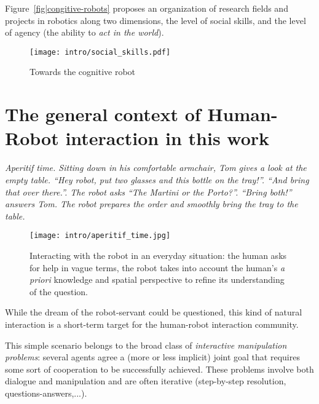 Figure~\ref{fig|congitive-robots} proposes an organization of research fields
and projects in robotics along two dimensions, the level of social skills, and
the level of agency (the ability to \emph{act in the world}).

\begin{figure}
    \centering
    \texttt{[image: intro/social\_skills.pdf]}
    \caption{Towards the cognitive robot}
    \label{fig|cognitive-robots}
\end{figure}



\section{The general context of Human-Robot interaction in this work}
\label{sect|general-context}

{\em Aperitif time. Sitting down in his comfortable armchair, Tom gives a look
at the empty table. ``{\em Hey robot, put two glasses and this bottle on the
tray!}''. ``{\em And bring that over there.}''. The robot asks ``{\em The
Martini or the Porto?}''. ``{\em Bring both!}'' answers Tom. The robot prepares
the order and smoothly bring the tray to the table.}

\begin{figure}%
    \centering
    \texttt{[image: intro/aperitif\_time.jpg]} 

    \caption{Interacting with the robot in an everyday situation: the human
    asks for help in vague terms, the robot takes into account the human's {\it
    a priori} knowledge and spatial perspective to refine its understanding of
    the question.} 

    \label{fig|vpt} 
\end{figure}

While the dream of the robot-servant could be questioned, this kind of natural
interaction is a short-term target for the human-robot interaction community.

This simple scenario belongs to the broad class of \emph{interactive
manipulation problems}: several agents agree a (more or less implicit) joint
goal that requires some sort of cooperation to be successfully achieved. These
problems involve both dialogue and manipulation and are often iterative
(step-by-step resolution, questions-answers,...).

